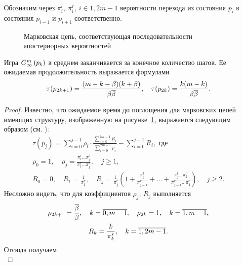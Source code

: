 {Обозначим через $\pi^l_i,\ \pi^r_i,\ i \in \overline{1, 2m-1}$ вероятности
перехода из состояния $p_i$ в состояния $p_{i-1}$ и $p_{i+1}$ соответственно.

\begin{figure}[tb]
  \centering
  
  \caption[Последовательность апостериорных вероятностей]{Марковская цепь,
    соответствующая последовательности апостериорных вероятностей}
  \label{ch1:fig:posterior-markov}
\end{figure}

\begin{proposition}
  \label{ch1:prop:game-duration}
  Игра $G_{\infty}^m\left({p_k}\right)$ в среднем заканчивается за конечное количество
  шагов. Ее ожидаемая продолжительность выражается формулами
  \begin{equation*} 
    \tau(p_{2k+1}) = \frac{(m-k-\beta)(k+\beta)}{\beta \overline{\beta}},\quad
    \tau(p_{2k}) = \frac{k(m-k)}{\beta \overline{\beta}}.
  \end{equation*}
\end{proposition}
\begin{proof}
  Известно, что ожидаемое время до поглощения для марковских цепей имеющих
  структуру, изображенную на рисунке~\ref{ch1:fig:posterior-markov}, выражается
  следующим образом (см. \cite[\S~12]{shiryaev11}):
  \begin{gather}
    \label{ch1:prop:game-duration:eq:1}
    \tau(p_j) =
    \sum_{i=0}^{j-1} \rho_i \cdot
    \frac{\sum_{i=0}^{2m-1} R_i}{\sum_{i=0}^{2m-1} \rho_i} -
    \sum_{i=0}^{j-1} R_i, \text{ где}\\
    \rho_0 = 1, \quad
    \rho_j = \frac{\pi^l_1 \ldots \pi^l_j}{\pi^r_1 \ldots \pi^r_j}, \quad j \geq 1,\nonumber\\
    R_0 = 0, \quad
    R_1 = \frac{1}{\pi^r_1}, \quad
    R_j = \frac{1}{\pi^r_j}\left( 
      1 + 
      \frac{\pi^l_j}{\pi^r_{j-1}} + 
      \ldots + \frac{\pi^l_j \ldots \pi^l_2}{\pi^r_{j-1} \ldots \pi^r_1}
    \right), \quad j \geq 2.\nonumber
  \end{gather}
  Несложно видеть, что для коэффициентов $\rho_j$, $R_j$ выполняется
  \begin{gather*}
    \rho_{2k+1} = \frac{\overline{\beta}}{\beta},\quad k = \overline{0, m-1},\quad
    \rho_{2k} = 1,\quad k = \overline{1, m-1},\\
    R_k = \frac{k}{\pi^r_k},\quad k = \overline{1, 2m-1}.
  \end{gather*}
  Отсюда получаем
  \begin{equation}
    \label{ch1:prop:game-duration:eq:2}

\end{equation}
\end{proof}}
